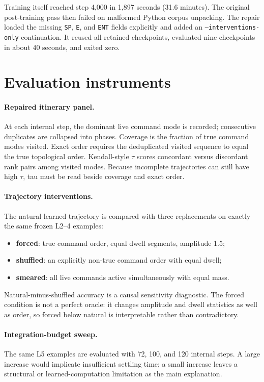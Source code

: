 \documentclass[10pt]{article}
\begin{document}
Training itself reached step 4,000 in 1,897 seconds (31.6 minutes). The original
post-training pass then failed on malformed Python corpus unpacking. The repair
loaded the missing \texttt{SP}, \texttt{E}, and \texttt{ENT} fields explicitly
and added an \texttt{--interventions-only} continuation. It reused all retained
checkpoints, evaluated nine checkpoints in about 40 seconds, and exited zero.

\section{Evaluation instruments}

\paragraph{Repaired itinerary panel.}
At each internal step, the dominant live command mode is recorded; consecutive
duplicates are collapsed into phases. Coverage is the fraction of true command
modes visited. Exact order requires the deduplicated visited sequence to equal
the true topological order. Kendall-style $\tau$ scores concordant versus
discordant rank pairs among visited modes. Because incomplete trajectories can
still have high $\tau$, tau must be read beside coverage and exact order.

\paragraph{Trajectory interventions.}
The natural learned trajectory is compared with three replacements on exactly
the same frozen L2--4 examples:

\begin{itemize}
\item \textbf{forced}: true command order, equal dwell segments, amplitude 1.5;
\item \textbf{shuffled}: an explicitly non-true command order with equal dwell;
\item \textbf{smeared}: all live commands active simultaneously with equal mass.
\end{itemize}

Natural-minus-shuffled accuracy is a causal sensitivity diagnostic. The forced
condition is not a perfect oracle: it changes amplitude and dwell statistics as
well as order, so forced below natural is interpretable rather than contradictory.

\paragraph{Integration-budget sweep.}
The same L5 examples are evaluated with 72, 100, and 120 internal steps. A large
increase would implicate insufficient settling time; a small increase leaves a
structural or learned-computation limitation as the main explanation.
\end{document}
